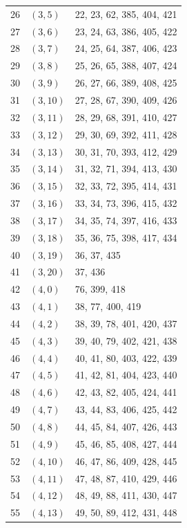 \documentclass{article}
\begin{document}
\begin{longtable}{lll}
  26 & \((3, 5)\) & 22, 23, 62, 385, 404, 421 \\
  27 & \((3, 6)\) & 23, 24, 63, 386, 405, 422 \\
  28 & \((3, 7)\) & 24, 25, 64, 387, 406, 423 \\
  29 & \((3, 8)\) & 25, 26, 65, 388, 407, 424 \\
  30 & \((3, 9)\) & 26, 27, 66, 389, 408, 425 \\
  31 & \((3, 10)\) & 27, 28, 67, 390, 409, 426 \\
  32 & \((3, 11)\) & 28, 29, 68, 391, 410, 427 \\
  33 & \((3, 12)\) & 29, 30, 69, 392, 411, 428 \\
  34 & \((3, 13)\) & 30, 31, 70, 393, 412, 429 \\
  35 & \((3, 14)\) & 31, 32, 71, 394, 413, 430 \\
  36 & \((3, 15)\) & 32, 33, 72, 395, 414, 431 \\
  37 & \((3, 16)\) & 33, 34, 73, 396, 415, 432 \\
  38 & \((3, 17)\) & 34, 35, 74, 397, 416, 433 \\
  39 & \((3, 18)\) & 35, 36, 75, 398, 417, 434 \\
  40 & \((3, 19)\) & 36, 37, 435 \\
  41 & \((3, 20)\) & 37, 436 \\
  42 & \((4, 0)\) & 76, 399, 418 \\
  43 & \((4, 1)\) & 38, 77, 400, 419 \\
  44 & \((4, 2)\) & 38, 39, 78, 401, 420, 437 \\
  45 & \((4, 3)\) & 39, 40, 79, 402, 421, 438 \\
  46 & \((4, 4)\) & 40, 41, 80, 403, 422, 439 \\
  47 & \((4, 5)\) & 41, 42, 81, 404, 423, 440 \\
  48 & \((4, 6)\) & 42, 43, 82, 405, 424, 441 \\
  49 & \((4, 7)\) & 43, 44, 83, 406, 425, 442 \\
  50 & \((4, 8)\) & 44, 45, 84, 407, 426, 443 \\
  51 & \((4, 9)\) & 45, 46, 85, 408, 427, 444 \\
  52 & \((4, 10)\) & 46, 47, 86, 409, 428, 445 \\
  53 & \((4, 11)\) & 47, 48, 87, 410, 429, 446 \\
  54 & \((4, 12)\) & 48, 49, 88, 411, 430, 447 \\
  55 & \((4, 13)\) & 49, 50, 89, 412, 431, 448 \\

\end{longtable}
\end{document}
